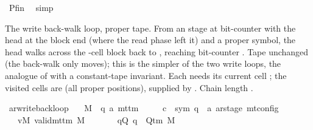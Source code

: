 \begin{isabellebody}
\ Pfin\ \isamarkupfalse%
\ simp\isanewline
\ \ \isamarkupfalse%
\isanewline
{}\isamarkupfalse%
%
\endisatagproof
{\isafoldproof}%
%
\isadelimproof
%
\endisadelimproof
%
\begin{isamarkuptext}%
The write back-walk loop, proper tape.  From an
   stage at bit-counter  with the head at
  the block end  (where the read phase left it) and
   a proper symbol, the head walks  across the
  -cell block back to , reaching
  bit-counter .  Tape unchanged (the back-walk only moves);
  this is the simpler of the two write loops, the analogue of
   with a constant-tape invariant.  Each
   needs its current cell ;
  the visited cells are  (all proper
  positions), supplied by .  Chain length .%
\end{isamarkuptext}\isamarkuptrue%
\isamarkupfalse%
\ ar{\isacharunderscore}{\kern0pt}write{\isacharunderscore}{\kern0pt}back{\isacharunderscore}{\kern0pt}loop{\isacharcolon}{\kern0pt}\isanewline
\ \ \ M\ {\isacharcolon}{\kern0pt}{\isacharcolon}{\kern0pt}\ {\isachardoublequoteopen}{\isacharparenleft}{\kern0pt}{\isacharprime}{\kern0pt}q{\isacharcomma}{\kern0pt}\ {\isacharprime}{\kern0pt}a{\isacharparenright}{\kern0pt}\ mttm{\isachardoublequoteclose}\isanewline
\ \ \ \ \ c{}\ {\isacharcolon}{\kern0pt}{\isacharcolon}{\kern0pt}\ {\isachardoublequoteopen}{\isacharparenleft}{\kern0pt}sym{}{\isacharcomma}{\kern0pt}\ {\isacharprime}{\kern0pt}q\ {\isasymtimes}\ {\isacharprime}{\kern0pt}a\ ar{\isacharunderscore}{\kern0pt}stage{\isacharparenright}{\kern0pt}\ mt{\isacharunderscore}{\kern0pt}config{\isachardoublequoteclose}\isanewline
\ \ \ vM{\isacharcolon}{\kern0pt}\ {\isachardoublequoteopen}valid{\isacharunderscore}{\kern0pt}mttm\ M{\isachardoublequoteclose}\isanewline
\ \ \ \ \ \ \ qQ{\isacharcolon}{\kern0pt}\ {\isachardoublequoteopen}q\ {\isasymin}\ Q{\isacharunderscore}{\kern0pt}tm\ M{\isachardoublequoteclose}\isanewline

\end{isabellebody}
